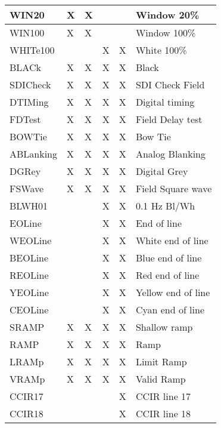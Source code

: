 \begin{tabular}{|l|l|l|l|l|l|}
WIN20											& X					& X						&						&						& Window 20\%\\ \hline
WIN100										& X					& X						&						&						& Window 100\%\\ \hline
WHITe100									&  					&  						&	X					&	X					& White 100\%\\ \hline
BLACk											& X					& X						& X					& X					& Black\\ \hline
SDICheck									& X					& X						& X					& X					& SDI Check Field\\ \hline
DTIMing										& X					& X						& X					& X					& Digital timing\\ \hline
FDTest										& X					& X						& X					& X					& Field Delay test\\ \hline
BOWTie										& X					& X						& X					& X					& Bow Tie\\ \hline
ABLanking									& X					& X						& X					& X					& Analog Blanking\\ \hline
DGRey											& X					& X						& X					& X					& Digital Grey\\ \hline
FSWave										& X					& X						& X					& X					& Field Square wave\\ \hline
BLWH01										&						&							& X					& X					& 0.1 Hz Bl/Wh\\ \hline
EOLine										&						&							& X					& X					& End of line\\ \hline
WEOLine 									&						&							& X					& X					& White end of line\\ \hline
BEOLine										&						&							& X					& X					& Blue end of line\\ \hline
REOLine										&						&							& X					& X					& Red end of line\\ \hline
YEOLine										&						&							& X					& X					& Yellow end of line\\ \hline
CEOLine										&						&							& X					& X					& Cyan end of line\\ \hline
SRAMP											& X					& X						& X					& X					& Shallow ramp\\ \hline
RAMP											& X					& X						& X					& X					& Ramp\\ \hline
LRAMp											& X					& X						& X					& X					& Limit Ramp\\ \hline
VRAMp											& X					& X						& X					& X					& Valid Ramp\\ \hline
CCIR17										&						&							&						& X					& CCIR line 17\\ \hline
CCIR18										&						&							&						& X					& CCIR line 18\\ \hline

\end{tabular}
